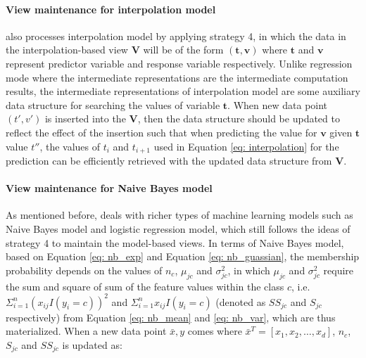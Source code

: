 \paragraph{View maintenance for interpolation model} \cite{deshpande2006mauvedb} also processes interpolation model by applying strategy 4, in which the data in the interpolation-based view $\textbf{V}$ will be of the form $(\textbf{t}, \textbf{v})$ where $\textbf{t}$ and $\textbf{v}$ represent predictor variable and response variable respectively. Unlike regression mode where the intermediate representations are the intermediate computation results, the intermediate representations of interpolation model are some auxiliary data structure for searching the values of variable $\textbf{t}$. When new data point $(t', v')$ is inserted into the $\textbf{V}$, then the data structure should be updated to reflect the effect of the insertion such that when predicting the value for $\textbf{v}$ given $\textbf{t}$ value $t''$, the values of $t_{i}$ and $t_{i+1}$ used in Equation \ref{eq: interpolation} for the prediction can be efficiently retrieved with the updated data structure from $\textbf{V}$.


\paragraph{View maintenance for Naive Bayes model}
As mentioned before, \cite{gupta2015processing} deals with richer types of machine learning models such as Naive Bayes model and logistic regression model, which still follows the ideas of strategy 4 to maintain the model-based views. In terms of Naive Bayes model, based on Equation \ref{eq: nb_exp} and Equation \ref{eq: nb_guassian}, the membership probability depends on the values of $n_c$, $\mu_{jc}$ and $\sigma_{jc}^2$, in which $\mu_{jc}$ and $\sigma_{jc}^2$ require the sum and square of sum of the feature values within the class $c$, i.e. $\Sigma_{i=1}^n(x_{ij}I(y_i=c))^2$ and $\Sigma_{i=1}^nx_{ij}I(y_i=c)$ (denoted as $SS_{jc}$ and $S_{jc}$ respectively) from Equation \ref{eq: nb_mean} and \ref{eq: nb_var}, which are thus materialized. When a new data point $\bar{x}, y$ comes where $\bar{x}^T = [x_1, x_2, \dots, x_d]$, $n_c$, $S_{jc}$ and $SS_{jc}$ is updated as:


